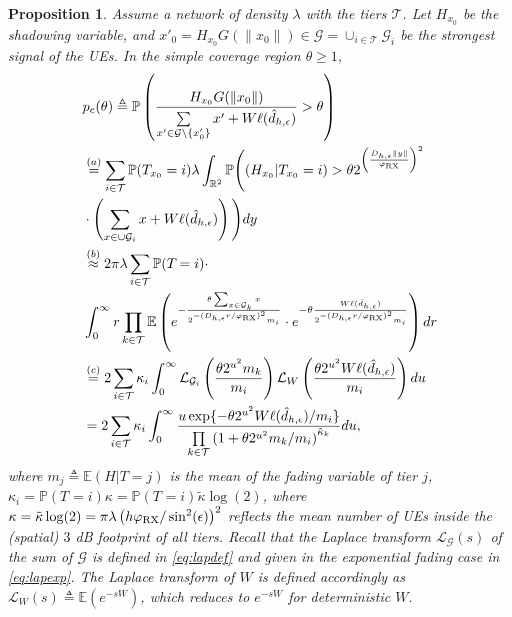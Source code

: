 \documentclass[conference]{IEEEtran}
\newcommand{\R}{\mathbb{R}}
\theoremstyle{definition}
\theoremstyle{plain}
\newtheorem{prop}[thm4]{Proposition}
\begin{document}
            
          \begin{prop}
            Assume a network of density $\lambda$ with the tiers $\mathcal{T}$. Let $H_{x_0}$ be the shadowing variable, and ${x'}_0 =  H_{x_0}G(\|x_0\|) \in \mathcal{G} =\cup_{i \in \mathcal{T}} \mathcal{G}_i$ be the strongest signal of the UEs. In the simple coverage region $\theta \geq 1$,
            \begin{align}
              \label{eq:probofcov}
              &p_c(\theta) \triangleq \mathbb{P}\left( \frac{H_{x_0} G(\|x_0\|)}{\sum\limits_{x' \in   \mathcal{G} \setminus \{x'_0\}}x'  + W\ell(\hat{d}_{h,\epsilon})} > \theta \right) \nonumber \\      
              &\overset{(a)}= \sum_{i\in \mathcal{T}} \mathbb{P}(T_{x_0}  = i)\lambda \int_{ \R^2}\mathbb{P}\Bigg((H_{x_0}|T_{x_0} = i) > \theta  2^{\left(\frac{D_{h,\epsilon}\|y\|}{\varphi_{\textup{RX}}}\right)^2 } \nonumber \\
              &\cdot \left(\sum_{x \in \cup\mathcal{G}_i }x +W\ell(\hat{d}_{h,\epsilon}) \right)\Bigg) \nonumber dy  \nonumber  \\              
              &\overset{(b)}{\approx} 2 \pi \lambda\sum_{i\in \mathcal{T}} \mathbb{P}(T_{}  = i) \cdot \nonumber \\
              &\int_{0}^{\infty} r \prod_{k \in \mathcal{T}}\mathbb{E} \left(e^{-\frac{\theta \sum_{x \in { \mathcal{G}_k}} x}{2^{-(D_{h,\epsilon}r/\varphi_{\textup{RX}})^2} m_i  }} \cdot e^{- \theta   \frac{W\ell(\hat{d}_{h,\epsilon})}{2^{-(D_{h,\epsilon}r/\varphi_{\textup{RX}})^2} m_i}} \right) dr \nonumber \\
              &\overset{(c)}{=}  2 {} \sum_{i \in \mathcal{T}}\kappa_i\int_0^{\infty} \mathcal{L}_{\mathcal{G}_i}\left(\frac{\theta 2^{u^2}  m_k}{m_i} \right)  \mathcal{L}_{W}\left( \frac{\theta 2^{u^2}W\ell(\hat{d}_{h,\epsilon})}{m_i} \right)du \nonumber \\
              &\overset{}{=}  2 {} \sum_{i \in \mathcal{T}}\kappa_i\int_0^{\infty}  \frac{u\exp \{- \theta 2^{u^2}W\ell(\hat{d}_{h,\epsilon})/m_i \}}{\prod\limits_{k \in \mathcal{T}}\left(1 + \theta 2^{u^2}  m_k/m_i\right)^{\tilde{\kappa}_k}} du,
            \end{align}
            where $m_j \triangleq \mathbb{E}(H| T = j)$ is the mean of the fading variable of tier $j$, ${\kappa}_i =\mathbb{P}(T_{}  = i) {\kappa}=\mathbb{P}(T_{}  = i) {\tilde{\kappa}}\log(2)$, where $  \kappa =  \tilde{\kappa}\log(2)=\pi \lambda   \left(h \varphi_{\textup{RX}}/\sin^2(\epsilon) \right)^2$ reflects the mean number of UEs inside the (spatial) $3$ dB footprint of all tiers. Recall that the Laplace transform $\mathcal{L}_{\mathcal{G}}(s)$ of the sum of $\mathcal{G}$  is defined in \eqref{eq:lapdef} and given in the exponential fading case in \eqref{eq:lapexp}. The Laplace transform of $W$ is defined accordingly as $\mathcal{L}_W(s) \triangleq \mathbb{E}\left(e^{-sW} \right)$, which reduces to $e^{-sW}$ for deterministic $W$.

\end{prop}
\end{document}
